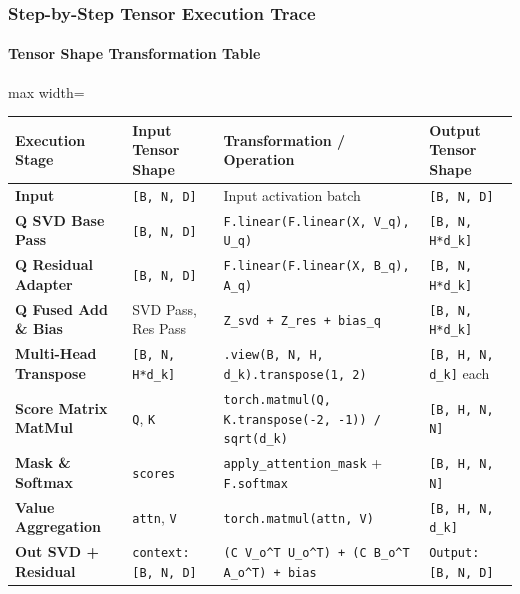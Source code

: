 \subsubsection*{Step-by-Step Tensor Execution Trace}

\paragraph{Tensor Shape Transformation Table}

\begin{center}
\begin{adjustbox}{max width=\columnwidth}
\renewcommand{\arraystretch}{1.2}
\begin{tabular}{llll}
\toprule
Execution Stage & Input Tensor Shape & Transformation / Operation & Output Tensor Shape \\
\midrule
\textbf{Input} & \texttt{[B, N, D]} & Input activation batch & \texttt{[B, N, D]} \\
\textbf{Q SVD Base Pass} & \texttt{[B, N, D]} & \texttt{F.linear(F.linear(X, V\_q), U\_q)} & \texttt{[B, N, H*d\_k]} \\
\textbf{Q Residual Adapter} & \texttt{[B, N, D]} & \texttt{F.linear(F.linear(X, B\_q), A\_q)} & \texttt{[B, N, H*d\_k]} \\
\textbf{Q Fused Add \& Bias} & SVD Pass, Res Pass & \texttt{Z\_svd + Z\_res + bias\_q} & \texttt{[B, N, H*d\_k]} \\
\textbf{Multi-Head Transpose} & \texttt{[B, N, H*d\_k]} & \texttt{.view(B, N, H, d\_k).transpose(1, 2)} & \texttt{[B, H, N, d\_k]} each \\
\textbf{Score Matrix MatMul} & \texttt{Q}, \texttt{K} & \texttt{torch.matmul(Q, K.transpose(-2, -1)) / sqrt(d\_k)} & \texttt{[B, H, N, N]} \\
\textbf{Mask \& Softmax} & \texttt{scores} & \texttt{apply\_attention\_mask} + \texttt{F.softmax} & \texttt{[B, H, N, N]} \\
\textbf{Value Aggregation} & \texttt{attn}, \texttt{V} & \texttt{torch.matmul(attn, V)} & \texttt{[B, H, N, d\_k]} \\
\textbf{Out SVD + Residual} & \texttt{context: [B, N, D]} & \texttt{(C V\_o\textasciicircum{}T U\_o\textasciicircum{}T) + (C B\_o\textasciicircum{}T A\_o\textasciicircum{}T) + bias} & \texttt{Output: [B, N, D]} \\

\bottomrule
\end{tabular}
\end{adjustbox}
\end{center}
